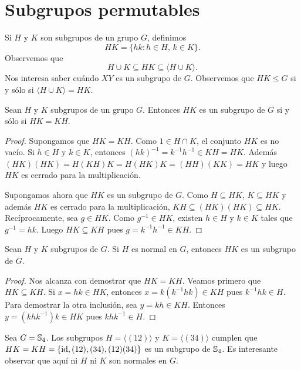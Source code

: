 \chapter{Subgrupos permutables}

Si $H$ y $K$ son subgrupos de un grupo $G$, definimos
\[
	HK=\{hk:h\in H,\,k\in K\}.
\]
Observemos que 
\[
H\cup K\subseteq HK\subseteq\langle H\cup K\rangle.
\]
Nos interesa saber cuándo $XY$ es un subgrupo de $G$. 
Observemos que $HK\leq G$ si y sólo si $\langle H\cup K\rangle=HK$. 

\begin{proposition}
	Sean $H$ y $K$ subgrupos de un grupo $G$. Entonces $HK$ es un subgrupo de
	$G$ si y sólo si $HK=KH$.
\end{proposition}

\begin{proof}
	Supongamos que $HK=KH$. Como $1\in H\cap K$, el conjunto $HK$ es no vacío.
	Si $h\in H$ y $k\in K$, entonces $(hk)^{-1}=k^{-1}h^{-1}\in KH=HK$. Además
	$(HK)(HK)=H(KH)K=H(HK)K=(HH)(KK)=HK$ y luego $HK$ es cerrado para la
	multiplicación. 

	Supongamos ahora que $HK$ es un subgrupo de $G$. Como $H\subseteq HK$,
	$K\subseteq HK$ y además $HK$ es cerrado para la multiplicación,
	$KH\subseteq (HK)(HK)\subseteq HK$. Recíprocamente, sea $g\in HK$. 
	Como $g^{-1}\in HK$, existen $h\in H$ y $k\in K$ tales que $g^{-1}=hk$.
	Luego $HK\subseteq KH$ pues 
	$g=k^{-1}h^{-1}\in KH$.
\end{proof}

\begin{proposition}
Sean $H$ y $K$ subgrupos de $G$. Si $H$ es normal en $G$, entonces $HK$ es un subgrupo de $G$.
\end{proposition}

\begin{proof}
Nos alcanza con demostrar que $HK=KH$. Veamos primero que $HK\subseteq KH$. Si $x=hk\in HK$, entonces $x=k(k^{-1}hk)\in KH$ pues $k^{-1}hk\in H$. Para demostrar
la otra inclusión, sea $y=kh\in KH$. Entonces $y=(khk^{-1})k\in HK$ pues $khk^{-1}\in H$. \end{proof}


\begin{example}
Sea $G=\mathbb{S}_4$. Los subgrupos $H=\langle (12)\rangle$ y $K=\langle (34)\rangle$ cumplen que $HK=KH=\{\operatorname{id},(12),(34),(12)(34)\}$ es un subgrupo de $\mathbb{S}_4$. Es interesante observar que aquí ni $H$ ni $K$ son normales en $G$.  
\end{example}

